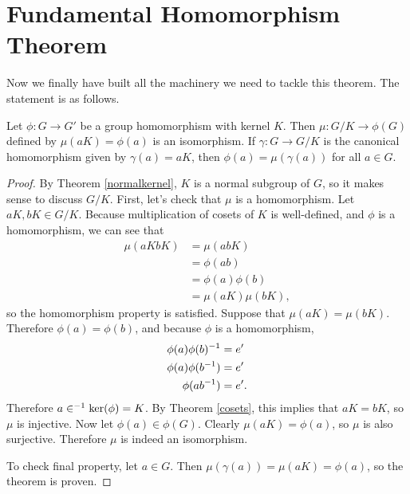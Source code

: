 \section{Fundamental Homomorphism Theorem}

Now we finally have built all the machinery we need to tackle this theorem. The statement is as follows.

\begin{theorem}
Let $\phi: G \to G'$ be a group homomorphism with kernel $K$. Then $\mu: G/K \to \phi(G)$ defined by $\mu(aK) = \phi(a)$ is an isomorphism. If $\gamma: G \to G/K$ is the canonical homomorphism given by $\gamma(a) = aK$, then $\phi(a) = \mu(\gamma(a))$ for all $a \in G$.
\end{theorem}

\begin{proof}
By Theorem \ref{normalkernel}, $K$ is a normal subgroup of $G$, so it makes sense to discuss $G/K$. First, let's check that $\mu$ is a homomorphism. Let $aK, bK \in G/K$. Because multiplication of cosets of $K$ is well-defined, and $\phi$ is a homomorphism, we can see that
\begin{align*}
    \mu(aKbK) &= \mu(abK) \\
    &= \phi(ab) \\
    &= \phi(a)\phi(b) \\
    &= \mu(aK)\mu(bK)\mathrm{,}
\end{align*}
so the homomorphism property is satisfied. Suppose that $\mu(aK) = \mu(bK).$ Therefore $\phi(a) = \phi(b)$, and because $\phi$ is a homomorphism,
\begin{align*}
    \phi(a)\phi(b)^{-1} &= e' \\
    \phi(a)\phi(b^{-1}) &= e' \\
    \phi(ab^{-1}) &= e'\mathrm{.}
\end{align*}
Therefore $a\in^{-1} \ker(\phi) = K$. By Theorem \ref{cosets}, this implies that $aK = bK$, so $\mu$ is injective. Now let $\phi(a) \in \phi(G)$. Clearly $\mu(aK) = \phi(a)$, so $\mu$ is also surjective. Therefore $\mu$ is indeed an isomorphism.

To check final property, let $a \in G$. Then $\mu(\gamma(a)) = \mu(aK) = \phi(a)$, so the theorem is proven.

\end{proof}
